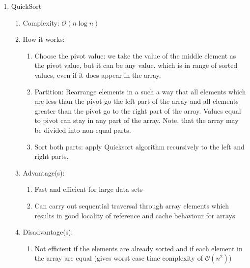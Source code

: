 \documentclass [12pt, executivepaper]{article}
\begin{document}
\begin{enumerate}

\item QuickSort

\begin{enumerate}

\item Complexity: $\mathcal{O}(n \log{} n)$

\item How it works:

\begin{enumerate}

\item Choose the pivot value: we take the value of the middle element as the pivot value, but it can be any value, which is in range of sorted values, even if it does appear in the array.

\item Partition: Rearrange elements in a such a way that all elements which are less than the pivot go the left part of the array and all elements greater than the pivot go to the right part of the array. Values equal to pivot can stay in any part of the array. Note, that the array may be divided into non-equal parts.

\item Sort both parts: apply Quicksort algorithm recursively to the left and right parts. 

\end{enumerate}

\item Advantage(s):

\begin{enumerate}

\item Fast and efficient for large data sets

\item Can carry out sequential traversal through array elements which results in good locality of reference and cache behaviour for arrays

\end{enumerate}

\item Disadvantage(s):

\begin{enumerate}

\item Not efficient if the elements are already sorted and if each element in the array are equal (gives worst case time complexity of $\mathcal{O}(n^2)$)


\end{enumerate}
\end{enumerate}
\end{enumerate}
\end{document}
